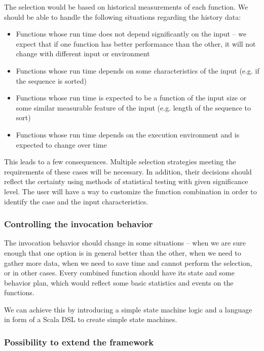 The selection would be based on historical measurements of each function. We should be able to handle the following situations regarding the history data:

\begin{itemize}
	\item Functions whose run time does not depend significantly on the input -- we expect that if one function has better performance than the other, it will not change with different input or environment
	\item Functions whose run time depends on some characteristics of the input (e.g. if the sequence is sorted)
	\item Functions whose run time is expected to be a function of the input size or some similar measurable feature of the input (e.g. length of the sequence to sort)
	\item Functions whose run time depends on the execution environment and is expected to change over time
\end{itemize}

This leads to a few consequences. Multiple selection strategies meeting the requirements of these cases will be necessary. In addition, their decisions should reflect the certainty using methods of statistical testing with given significance level. The user will have a way to customize the function combination in order to identify the case and the input characteristics.

\subsubsection{Controlling the invocation behavior}

The invocation behavior should change in some situations -- when we are sure enough that one option is in general better than the other, when we need to gather more data, when we need to save time and cannot perform the selection, or in other cases. Every combined function should have its state and some behavior plan, which would reflect some basic statistics and events on the functions.

We can achieve this by introducing a simple state machine logic and a language in form of a Scala DSL to create simple state machines.

\subsubsection{Possibility to extend the framework}

